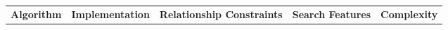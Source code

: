 \setlength\tabcolsep{0pt}
\small{
\begin{table*}[h!]
    \begin{center}
        \begin{tabular}{|c|ccc|cccc|ccc|c|} 

        

                        \hline
            \multicolumn{1}{|c|}{\multirow{2}{*}{\textbf{Algorithm}}}& 
            \multicolumn{3}{|c|}{\multirow{2}{*}{\textbf{Implementation}}} &
            \multicolumn{4}{|c|}{\multirow{2}{*}{\textbf{Relationship Constraints}}} &
            \multicolumn{3}{|c|}{\multirow{2}{*}{\textbf{Search Features}}} &
            \multicolumn{1}{|c|}{\multirow{2}{*}{\textbf{Complexity}}} \\
            &&&&&&&&&&& \\
        

\end{tabular}
\end{center}
\end{table*}}
